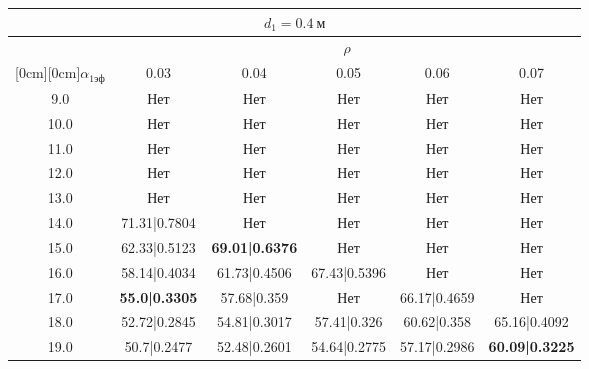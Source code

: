 \documentclass[20pt]{article}
\begin{document}
\begin{center}
\begin{tabular}{c|ccccc}
\hline
	\multicolumn{6}{c}{$d_{1}=0.4 \ м$} \\
\hline
	 & \multicolumn{5}{|c}{$\rho$} \\
	\cline{2-6}
	\raisebox{1.5ex}[0cm][0cm]{$\alpha_{1эф}$} & 0.03 & 0.04 & 0.05 & 0.06 & 0.07\\
\hline
	9.0 & 	Нет & 	Нет & 	Нет & 	Нет & 	Нет\\
	10.0 & 	Нет & 	Нет & 	Нет & 	Нет & 	Нет\\
	11.0 & 	Нет & 	Нет & 	Нет & 	Нет & 	Нет\\
	12.0 & 	Нет & 	Нет & 	Нет & 	Нет & 	Нет\\
	13.0 & 	Нет & 	Нет & 	Нет & 	Нет & 	Нет\\
	14.0 & 	71.31|0.7804 & 	Нет & 	Нет & 	Нет & 	Нет\\
	15.0 & 	62.33|0.5123 & 	\textbf{69.01|0.6376} & 	Нет & 	Нет & 	Нет\\
	16.0 & 	58.14|0.4034 & 	61.73|0.4506 & 	67.43|0.5396 & 	Нет & 	Нет\\
	17.0 & 	\textbf{55.0|0.3305} & 	57.68|0.359 & 	Нет & 	66.17|0.4659 & 	Нет\\
	18.0 & 	52.72|0.2845 & 	54.81|0.3017 & 	57.41|0.326 & 	60.62|0.358 & 	65.16|0.4092\\
	19.0 & 	50.7|0.2477 & 	52.48|0.2601 & 	54.64|0.2775 & 	57.17|0.2986 & 	\textbf{60.09|0.3225}\\
\end{tabular}


\end{center}
\end{document}
